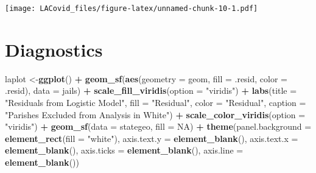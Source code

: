 \documentclass[
]{article}
\newenvironment{Shaded}{\begin{snugshade}}{\end{snugshade}}
\newcommand{\DataTypeTok}[1]{\textcolor[rgb]{0.13,0.29,0.53}{#1}}
\newcommand{\DecValTok}[1]{\textcolor[rgb]{0.00,0.00,0.81}{#1}}
\newcommand{\KeywordTok}[1]{\textcolor[rgb]{0.13,0.29,0.53}{\textbf{#1}}}
\newcommand{\NormalTok}[1]{#1}
\newcommand{\OperatorTok}[1]{\textcolor[rgb]{0.81,0.36,0.00}{\textbf{#1}}}
\newcommand{\OtherTok}[1]{\textcolor[rgb]{0.56,0.35,0.01}{#1}}
\newcommand{\StringTok}[1]{\textcolor[rgb]{0.31,0.60,0.02}{#1}}
\begin{document}
\texttt{[image: LACovid\_files/figure-latex/unnamed-chunk-10-1.pdf]}

\begin{Shaded}
\end{Shaded}

\hypertarget{diagnostics}{%
\section{Diagnostics}\label{diagnostics}}

\begin{Shaded}
\begin{Highlighting}[]
\NormalTok{laplot <-}\KeywordTok{ggplot}\NormalTok{() }\OperatorTok{+}
\StringTok{  }\KeywordTok{geom_sf}\NormalTok{(}\KeywordTok{aes}\NormalTok{(}\DataTypeTok{geometry =}\NormalTok{ geom, }\DataTypeTok{fill =}\NormalTok{ .resid, }\DataTypeTok{color =}\NormalTok{ .resid), }\DataTypeTok{data =}\NormalTok{ jails) }\OperatorTok{+}
\StringTok{  }\KeywordTok{scale_fill_viridis}\NormalTok{(}\DataTypeTok{option =} \StringTok{"viridis"}\NormalTok{) }\OperatorTok{+}\StringTok{ }
\StringTok{    }\KeywordTok{labs}\NormalTok{(}\DataTypeTok{title =} \StringTok{"Residuals from Logistic Model"}\NormalTok{,}
       \DataTypeTok{fill =} \StringTok{"Residual"}\NormalTok{,}
       \DataTypeTok{color =} \StringTok{"Residual"}\NormalTok{,}
       \DataTypeTok{caption =} \StringTok{"Parishes Excluded from Analysis in White"}\NormalTok{) }\OperatorTok{+}\StringTok{ }
\StringTok{  }\KeywordTok{scale_color_viridis}\NormalTok{(}\DataTypeTok{option =} \StringTok{"viridis"}\NormalTok{) }\OperatorTok{+}
\StringTok{  }\KeywordTok{geom_sf}\NormalTok{(}\DataTypeTok{data =}\NormalTok{ stategeo, }\DataTypeTok{fill =} \OtherTok{NA}\NormalTok{) }\OperatorTok{+}
\StringTok{  }\KeywordTok{theme}\NormalTok{(}\DataTypeTok{panel.background =} \KeywordTok{element_rect}\NormalTok{(}\DataTypeTok{fill =} \StringTok{"white"}\NormalTok{),}
        \DataTypeTok{axis.text.y =} \KeywordTok{element_blank}\NormalTok{(),}
        \DataTypeTok{axis.text.x =} \KeywordTok{element_blank}\NormalTok{(),}
        \DataTypeTok{axis.ticks =} \KeywordTok{element_blank}\NormalTok{(),}
         \DataTypeTok{axis.line =} \KeywordTok{element_blank}\NormalTok{())}
\end{Highlighting}
\end{Shaded}
\end{document}
